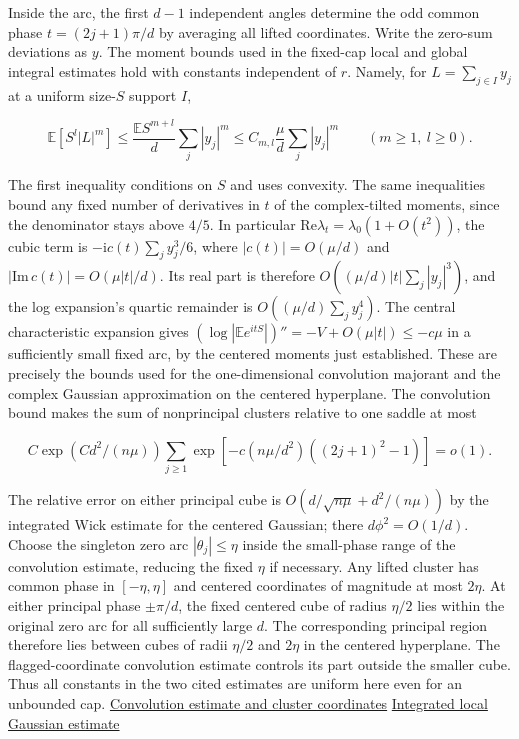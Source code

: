 Inside the arc, the first $d-1$ independent angles determine the odd common phase $t=(2j+1)\pi/d$ by averaging all lifted coordinates. Write the zero-sum deviations as $y$. The moment bounds used in the fixed-cap local and global integral estimates hold with constants independent of $r$. Namely, for $L=\sum_{j\in I} y_j$ at a uniform size-$S$ support $I$,

\begin{equation*}
\mathbb E[S^l|L|^m]\le \frac{\mathbb E S^{m+l}}{d}\sum_j|y_j|^m
\le C_{m,l}\frac{\mu}{d}\sum_j |y_j|^m
\qquad(m\ge1,\ l\ge0).
\end{equation*}

The first inequality conditions on $S$ and uses convexity. The same inequalities bound any fixed number of derivatives in $t$ of the complex-tilted moments, since the denominator stays above $4/5$. In particular $\mathrm{Re}\lambda_t=\lambda_0(1+O(t^2))$, the cubic term is $-\mathrm{i}c(t)\sum_j y_j^3/6$, where $|c(t)|=O(\mu/d)$ and $|\mathrm{Im}\,c(t)|=O(\mu|t|/d)$. Its real part is therefore $O((\mu/d)|t|\sum_j|y_j|^3)$, and the log expansion's quartic remainder is $O((\mu/d)\sum_j y_j^4)$. The central characteristic expansion gives $(\log|\mathbb E e^{itS}|)''=-V+O(\mu |t|)\le-c\mu$ in a sufficiently small fixed arc, by the centered moments just established. These are precisely the bounds used for the one-dimensional convolution majorant and the complex Gaussian approximation on the centered hyperplane. The convolution bound makes the sum of nonprincipal clusters relative to one saddle at most

\begin{equation*}
C\exp(C d^2/(n\mu))\sum_{j\ge1}\exp[-c(n\mu/d^2)((2j+1)^2-1)]=o(1).
\end{equation*}

The relative error on either principal cube is $O(d/\sqrt{n\mu}+d^2/(n\mu))$ by the integrated Wick estimate for the centered Gaussian; there $d\phi^2=O(1/d)$. Choose the singleton zero arc $|\theta_j|\le\eta$ inside the small-phase range of the convolution estimate, reducing the fixed $\eta$ if necessary. Any lifted cluster has common phase in $[-\eta,\eta]$ and centered coordinates of magnitude at most $2\eta$. At either principal phase $\pm\pi/d$, the fixed centered cube of radius $\eta/2$ lies within the original zero arc for all sufficiently large $d$. The corresponding principal region therefore lies between cubes of radii $\eta/2$ and $2\eta$ in the centered hyperplane. The flagged-coordinate convolution estimate controls its part outside the smaller cube. Thus all constants in the two cited estimates are uniform here even for an unbounded cap. \href{https://github.com/ProgramComputer/open-math-research/blob/f7e10f84dd21fec44ca58c60bae0879d12ebd89b/topics/balanced-arrays/fixed-cap/fixed-cap-moving-u-localization.md}{Convolution estimate and cluster coordinates} \enspace \href{https://github.com/ProgramComputer/open-math-research/blob/f7e10f84dd21fec44ca58c60bae0879d12ebd89b/topics/balanced-arrays/fixed-cap/tall-sparse-transverse-saddle.md}{Integrated local Gaussian estimate}

